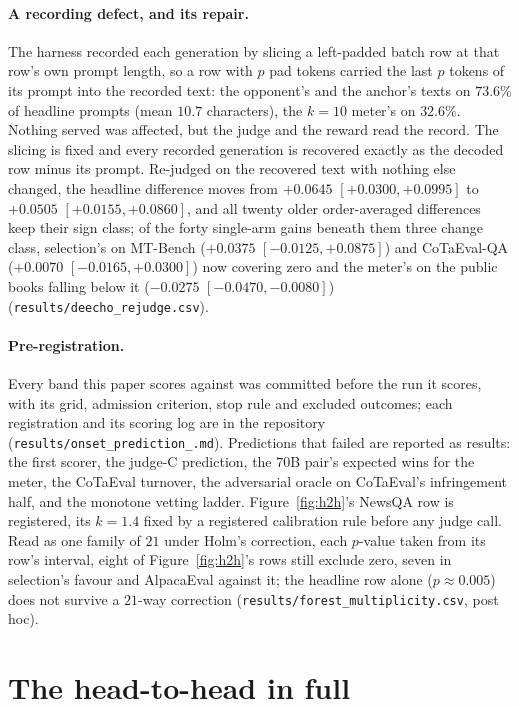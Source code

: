\paragraph{A recording defect, and its repair.}
The harness recorded each generation by slicing a left-padded batch row at that row's own prompt length,
so a row with $p$ pad tokens carried the last $p$ tokens of its prompt into the recorded text: the
opponent's and the anchor's texts on $73.6\%$ of headline prompts (mean $10.7$ characters), the $k=10$
meter's on $32.6\%$. Nothing served was affected, but the judge and the reward read the record. The slicing
is fixed and every recorded generation is recovered exactly as the decoded row minus its prompt. Re-judged
on the recovered text with nothing else changed, the headline difference moves from $+0.0645$
$[+0.0300, +0.0995]$ to $+0.0505$ $[+0.0155, +0.0860]$, and all twenty older order-averaged differences keep their sign class; of the forty single-arm gains beneath them three change class, selection's on MT-Bench ($+0.0375$ $[-0.0125, +0.0875]$) and CoTaEval-QA ($+0.0070$ $[-0.0165, +0.0300]$) now covering zero and the meter's on the public books falling below it ($-0.0275$ $[-0.0470, -0.0080]$) (\texttt{results/\allowbreak deecho\_\allowbreak rejudge.csv}).

\paragraph{Pre-registration.}
Every band this paper scores against was committed before the run it scores, with its grid, admission
criterion, stop rule and excluded outcomes; each registration and its scoring log are in the repository
(\texttt{results/\allowbreak onset\_\allowbreak prediction\_\allowbreak *.md}). Predictions that failed are reported as
results: the first scorer, the judge-C prediction, the $70$B pair's expected wins for the meter, the
CoTaEval turnover, the adversarial oracle on CoTaEval's infringement half, and the monotone vetting ladder.
Figure~\ref{fig:h2h}'s NewsQA row is registered, its $k=1.4$ fixed by a registered calibration rule before
any judge call. Read as one family of $21$ under Holm's correction, each $p$-value taken from its row's
interval, eight of Figure~\ref{fig:h2h}'s rows still exclude zero, seven in selection's favour and
AlpacaEval against it; the headline row alone ($p \approx 0.005$) does not survive a $21$-way correction
(\texttt{results/\allowbreak forest\_\allowbreak multiplicity.csv}, post hoc).

\section{The head-to-head in full}\label{app:sel-h2h}

